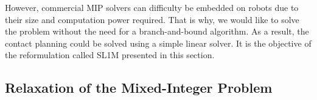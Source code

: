 However, commercial MIP solvers can difficulty be embedded on robots due to their size and computation power required.
That is why, we would like to solve the problem without the need for a branch-and-bound algorithm.
As a result, the contact planning could be solved using a simple linear solver.
It is the objective of the reformulation called SL1M \cite{sl1m_v1} presented in this section.

\subsection{Relaxation of the Mixed-Integer Problem}

